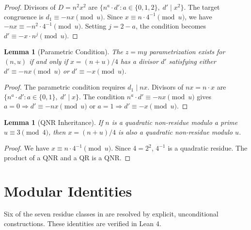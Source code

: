 \documentclass[11pt,a4paper]{article}
\theoremstyle{plain}
\newtheorem{lemma}[theorem]{Lemma}
\theoremstyle{plain}
\theoremstyle{definition}
\numberwithin{equation}{section}
\begin{document}
\begin{proof}
Divisors of $D = n^2 x^2$ are $\{n^a \cdot d' : a \in \{0,1,2\},\; d' \mid x^2\}$. The target congruence is $d_1 \equiv -nx \pmod{u}$. Since $x \equiv n \cdot 4^{-1} \pmod{u}$, we have $-nx \equiv -n^2 \cdot 4^{-1} \pmod{u}$. Setting $j = 2 - a$, the condition becomes $d' \equiv -x \cdot n^j \pmod{u}$.
\end{proof}

\begin{lemma}[Parametric Condition]\label{lem:parametric}
The $z = my$ parametrization exists for $(n, u)$ if and only if $x = (n+u)/4$ has a divisor $d'$ satisfying either $d' \equiv -nx \pmod{u}$ or $d' \equiv -x \pmod{u}$.
\end{lemma}

\begin{proof}
The parametric condition requires $d_1 \mid nx$. Divisors of $nx = n \cdot x$ are $\{n^a \cdot d' : a \in \{0, 1\},\; d' \mid x\}$. The condition $n^a \cdot d' \equiv -nx \pmod{u}$ gives $a = 0 \Rightarrow d' \equiv -nx \pmod{u}$ or $a = 1 \Rightarrow d' \equiv -x \pmod{u}$.
\end{proof}

\begin{lemma}[QNR Inheritance]\label{lem:qnr}
If $n$ is a quadratic non-residue modulo a prime $u \equiv 3 \pmod{4}$, then $x = (n+u)/4$ is also a quadratic non-residue modulo $u$.
\end{lemma}

\begin{proof}
We have $x \equiv n \cdot 4^{-1} \pmod{u}$. Since $4 = 2^2$, $4^{-1}$ is a quadratic residue. The product of a QNR and a QR is a QNR.
\end{proof}

\section{Modular Identities}\label{sec:modular}

Six of the seven residue classes in  are resolved by explicit, unconditional constructions. These identities are verified in Lean 4.
\end{document}

